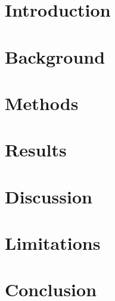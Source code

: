 \documentclass[sigconf]{acmart}
\begin{document}
\keywords{}

\maketitle

\section{Introduction}



\section{Background}




\section{Methods}



\section{Results}



\section{Discussion}



\section{Limitations}



\section{Conclusion}





\balance

\end{document}
